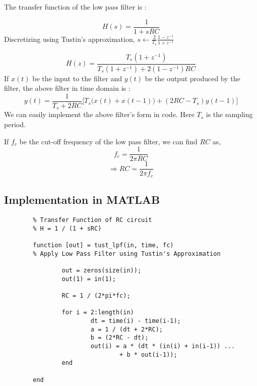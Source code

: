 \documentclass[report.tex]{subfiles}
\begin{document}
        The transfer function of the low pass filter is :
        
        $$
        H(s) = \frac{1}{1 + sRC}
        $$
        Discretizing using Tustin's approximation,
        $ s \leftarrow \frac{2}{T_s} \frac{1 - z^{-1}}{1 + z^{-1}} $

        $$
        H(z) = \frac{T_s (1 + z^{-1})}{T_s (1 + z^{-1}) + 2 (1 - z^{-1}) RC}
        $$
        If $x(t)$ be the input to the filter and $y(t)$ be the output produced
        by the filter, the above filter in time domain is :
        $$
        y(t) = \frac{1}{T_s + 2RC} \Bigg [T_s \Bigg (x(t) + x(t-1)\Bigg) +
        (2RC - T_s) y(t-1) \Bigg ]
        $$
        We can easily implement the above filter's form in code. Here $T_s$ is
        the sampling period.

        If $f_c$ be the cut-off frequency of the low pass filter, we can find
        $RC$ as,
        $$
        f_c = \frac{1}{2 \pi RC}
        $$
        $$
        \Rightarrow
        RC = \frac{1}{2 \pi f_c}
        $$

        \subsection{Implementation in MATLAB}
        \begin{lstlisting}
        % Transfer Function of RC circuit
        % H = 1 / (1 + sRC)

        function [out] = tust_lpf(in, time, fc)
        % Apply Low Pass Filter using Tustin's Approximation

                out = zeros(size(in));
                out(1) = in(1);
                
                RC = 1 / (2*pi*fc);
                
                for i = 2:length(in)
                        dt = time(i) - time(i-1);
                        a = 1 / (dt + 2*RC);
                        b = (2*RC - dt);
                        out(i) = a * (dt * (in(i) + in(i-1)) ...
                                + b * out(i-1));
                end

        end
        \end{lstlisting}
        
\end{document}
